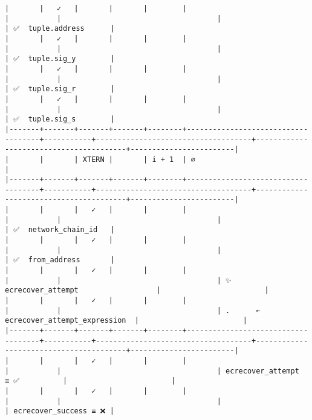 \documentclass[varwidth=\maxdimen,margin=0.5cm,multi={verbatim}]{standalone}
\begin{document}
\begin{verbatim}
|       |   ✓   |       |       |        |                                    |           |                                    |                                        | ✅  tuple.address      |
|       |   ✓   |       |       |        |                                    |           |                                    |                                        | ✅  tuple.sig_y        |
|       |   ✓   |       |       |        |                                    |           |                                    |                                        | ✅  tuple.sig_r        |
|       |   ✓   |       |       |        |                                    |           |                                    |                                        | ✅  tuple.sig_s        |
|-------+-------+-------+-------+--------+------------------------------------+-----------+------------------------------------+----------------------------------------+------------------------|
|       |       | XTERN |       | i + 1  | ∅                                  |  
|-------+-------+-------+-------+--------+------------------------------------+-----------+------------------------------------+----------------------------------------+------------------------|
|       |       |   ✓   |       |        |                                    |           |                                    |                                        | ✅  network_chain_id   |
|       |       |   ✓   |       |        |                                    |           |                                    |                                        | ✅  from_address       |
|       |       |   ✓   |       |        |                                    |           |                                    | ✨  ecrecover_attempt                  |                        |
|       |       |   ✓   |       |        |                                    |           |                                    | .      ← ecrecover_attempt_expression  |                        |
|-------+-------+-------+-------+--------+------------------------------------+-----------+------------------------------------+----------------------------------------+------------------------|
|       |       |   ✓   |       |        |                                    |           |                                    | ecrecover_attempt        ≡ ✅          |                        |
|       |       |   ✓   |       |        |                                    |           |                                    |                                        | ecrecover_success ≡ ❌ |

\end{verbatim}
\end{document}
